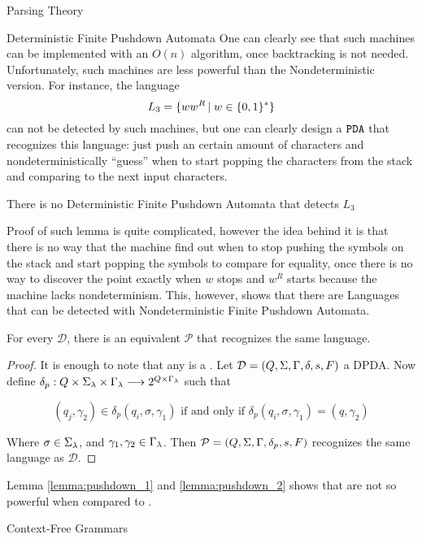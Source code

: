 \begin{section}{Parsing Theory}
\begin{subsection}{Deterministic Finite Pushdown Automata}
One can clearly see that such machines can be implemented with an $O(n)$ algorithm,
once backtracking is not needed. Unfortunately, such machines are less powerful
than the Nondeterministic version. For instance, the language
$$L_3 = \{ww^R\,|\;w \in \{0, 1\}^*\}$$
can not be detected by such machines, but one can clearly design a $\texttt{PDA}$
that recognizes this language: just push an certain amount of characters
and nondeterministically ``guess'' when to start popping the characters
from the stack and comparing to the next input characters.

\begin{lemma}\label{lemma:pushdown_1}
	There is no Deterministic Finite Pushdown Automata that detects $L_3$
\end{lemma}
Proof of such lemma is quite complicated, however the idea behind it is that
there is no way that the machine find out when to stop pushing the symbols
on the stack and start popping the symbols to compare for equality, once
there is no way to discover the point exactly when $w$ stops and $w^R$ starts
because the machine lacks nondeterminism. This, however, shows that there
are Languages that can be detected with Nondeterministic Finite Pushdown
Automata.

\begin{lemma}\label{lemma:pushdown_2}
	For every  $\mathcal{D}$, there is
	an equivalent  $\mathcal{P}$ that recognizes the
	same language.
\end{lemma}
\begin{proof}
	 It is enough to note that any  is a .  Let $\mathcal{D}
	 = (Q, \Sigma, \Gamma, \delta, s, F)$ a DPDA. Now define
	 $\delta_p : Q\times\Sigma_\lambda\times\Gamma_\lambda \longrightarrow 2^{Q\times\Gamma_\lambda}$ such that

	 $$ (q_j, \gamma_2) \in
	 \delta_p(q_i, \sigma, \gamma_1) \text{ if and only if } \delta_p(q_i,
	 \sigma, \gamma_1) = (q, \gamma_2)$$

	 Where $\sigma \in \Sigma_\lambda$, and
	 $\gamma_1, \gamma_2 \in \Gamma_\lambda$. Then $\mathcal{P} = (Q, \Sigma, \Gamma,
	 \delta_p, s, F)$ recognizes the same language as $\mathcal{D}$.
\end{proof}

Lemma \ref{lemma:pushdown_1} and \ref{lemma:pushdown_2} shows that  are not
so powerful when compared to .

\end{subsection}

\begin{subsection}{Context-Free Grammars}\label{cfg}


\end{subsection}
\end{section}
